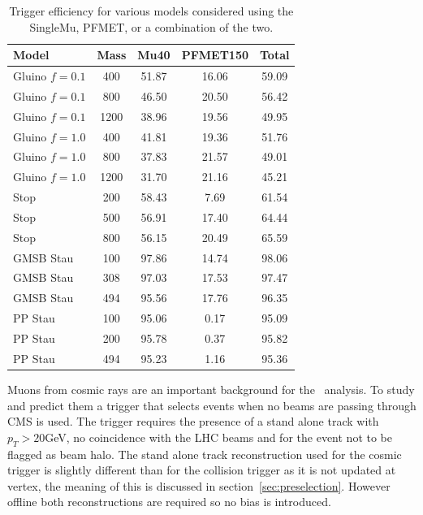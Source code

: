 \begin{table}
 \begin{center}
  \caption{Trigger efficiency for various models considered using the SingleMu, PFMET, or a combination of the two.
     \label{tab:triggEffGl}}
  \begin{tabular}{|l|c|c|c|c|} \hline
      Model     & Mass  & Mu40       & PFMET150   & Total                 \\ \hline
 Gluino $f=0.1$ &  400  & 51.87      & 16.06      & 59.09    \\
 Gluino $f=0.1$ &  800  & 46.50      & 20.50      & 56.42    \\
 Gluino $f=0.1$ & 1200  & 38.96      & 19.56      & 49.95    \\
 Gluino $f=1.0$ &  400  & 41.81      & 19.36      & 51.76    \\
 Gluino $f=1.0$ &  800  & 37.83      & 21.57      & 49.01    \\
 Gluino $f=1.0$ & 1200  & 31.70      & 21.16      & 45.21    \\
           Stop &  200  & 58.43      &  7.69      & 61.54    \\
           Stop &  500  & 56.91      & 17.40      & 64.44    \\
           Stop &  800  & 56.15      & 20.49      & 65.59    \\
      GMSB Stau &  100  & 97.86      & 14.74      & 98.06    \\
      GMSB Stau &  308  & 97.03      & 17.53      & 97.47    \\
      GMSB Stau &  494  & 95.56      & 17.76      & 96.35    \\
        PP Stau &  100  & 95.06      &  0.17      & 95.09    \\
        PP Stau &  200  & 95.78      &  0.37      & 95.82    \\
        PP Stau &  494  & 95.23      &  1.16      & 95.36    \\ \hline
  \end{tabular}
 \end{center}
\end{table}

Muons from cosmic rays are an important background for the \muononly\ analysis. To study and predict them a trigger that selects events when no beams are passing through
CMS is used. The trigger requires the presence of a stand alone track with $p_T > 20$GeV, no coincidence with the LHC beams and for the event not to be flagged as
beam halo. The stand alone track reconstruction used for the cosmic trigger is slightly different than for the collision trigger as it is not updated at vertex, the
meaning of this is discussed in section~\ref{sec:preselection}. However offline both reconstructions are required so no bias is introduced.

